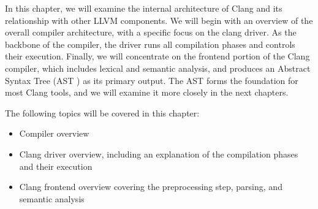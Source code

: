 In this chapter, we will examine the internal architecture of Clang and its relationship with other LLVM components. We will begin with an overview of the overall compiler architecture, with a specific focus on the clang driver. As the backbone of the compiler, the driver runs all compilation phases and controls their execution. Finally, we will concentrate on the frontend portion of the Clang compiler, which includes lexical and semantic analysis, and produces an Abstract Syntax Tree (AST ) as its primary output. The AST forms the foundation for most Clang tools, and we will examine it more closely in the next chapters.

The following topics will be covered in this chapter:

\begin{itemize}
\item
Compiler overview

\item
Clang driver overview, including an explanation of the compilation phases and their execution

\item
Clang frontend overview covering the preprocessing step, parsing, and semantic analysis
\end{itemize}